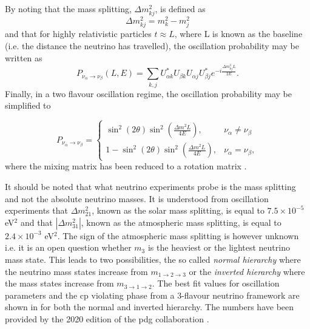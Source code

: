 By noting that the mass splitting, $\Delta m^2_{kj}$, is defined as 
\begin{equation}
    \Delta m^2_{kj} = m_k^2 - m_j^2
\end{equation}
and that for highly relativistic particles $t \approx L$, where L is known as the baseline (i.e. the distance the neutrino has travelled), the oscillation probability may be written as 
\begin{equation}
     P_{\nu_\alpha \rightarrow \nu_\beta}(L,E) = \sum_{k,j} U^*_{\alpha k} U_{\beta k} U_{\alpha j} U^*_{\beta j} e^{-i\frac{\Delta m^2_{kj}L}{2E}}.
\end{equation}
Finally, in a two flavour oscillation regime, the oscillation probability may be simplified to

\begin{equation}
  P_{\nu_\alpha \rightarrow \nu_\beta}=\begin{cases}
    \sin^2(2\theta)\sin^2{(\frac{\Delta m^2L}{4E})}, & \nu_\alpha \neq \nu_\beta \\
    1 - \sin^2(2\theta)\sin^2{(\frac{\Delta m^2L}{4E})}, & \nu_{\alpha} = \nu_{\beta},
  \end{cases}
  \label{eqn:osc_probability}
\end{equation}
where the mixing matrix has been reduced to a rotation matrix \cite{Fundamentals_of_Neutrino_Physics_and_Astrophysics}. 

It should be noted that what neutrino experiments probe is the mass splitting and not the absolute neutrino masses. It is understood from oscillation experiments that $\Delta m_{21}^2$, known as the solar mass splitting, is equal to $7.5 \times 10^{-5}$ eV$^2$ and that $|\Delta m_{31}^2|$, known as the atmospheric mass splitting, is equal to $2.4 \times 10^{-3}$ eV$^2$. The sign of the atmospheric mass splitting is however unknown i.e. it is an open question whether $m_3$ is the heaviest or the lightest neutrino mass state. This leads to two possibilities, the so called \textit{normal hierarchy} where the neutrino mass states increase from $m_{1 \rightarrow 2 \rightarrow 3}$ or the \textit{inverted hierarchy} where the mass states increase from $m_{3 \rightarrow 1 \rightarrow 2}$. The best fit values for oscillation parameters and the \gls{cp} violating phase from a 3-flavour neutrino framework are shown in  for both the normal and inverted hierarchy. The numbers have been provided by the 2020 edition of the \gls{pdg} collaboration \cite{PDG_2020}. 

